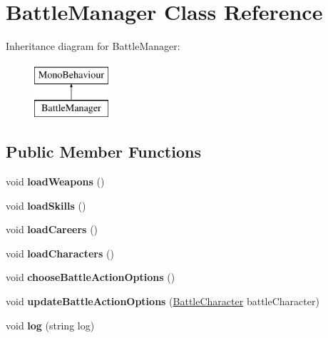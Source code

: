 \hypertarget{class_battle_manager}{}\section{Battle\+Manager Class Reference}
\label{class_battle_manager}
Inheritance diagram for Battle\+Manager\+:\begin{figure}[H]
\begin{center}
\leavevmode
\includegraphics[height=2.000000cm]{class_battle_manager}
\end{center}
\end{figure}
\subsection*{Public Member Functions}
\begin{DoxyCompactItemize}
\item 
void {\bfseries load\+Weapons} ()\hypertarget{class_battle_manager_a9e0d43290178a392008003dd11749f41}{}\label{class_battle_manager_a9e0d43290178a392008003dd11749f41}

\item 
void {\bfseries load\+Skills} ()\hypertarget{class_battle_manager_ac0f8f7e98a872d36a5306f4f6a9efd2d}{}\label{class_battle_manager_ac0f8f7e98a872d36a5306f4f6a9efd2d}

\item 
void {\bfseries load\+Careers} ()\hypertarget{class_battle_manager_ac81f723ff972fcc3560c1e8b4e21021c}{}\label{class_battle_manager_ac81f723ff972fcc3560c1e8b4e21021c}

\item 
void {\bfseries load\+Characters} ()\hypertarget{class_battle_manager_a9dbc581b42d93189af76255d0a97bfe8}{}\label{class_battle_manager_a9dbc581b42d93189af76255d0a97bfe8}

\item 
void {\bfseries choose\+Battle\+Action\+Options} ()\hypertarget{class_battle_manager_a5c1f4bd0e5bd3ed84bff11aec817a32f}{}\label{class_battle_manager_a5c1f4bd0e5bd3ed84bff11aec817a32f}

\item 
void {\bfseries update\+Battle\+Action\+Options} (\hyperlink{class_battle_character}{Battle\+Character} battle\+Character)\hypertarget{class_battle_manager_a1a69feabd37972f705051cd93ee492cd}{}\label{class_battle_manager_a1a69feabd37972f705051cd93ee492cd}

\item 
void {\bfseries log} (string log)\hypertarget{class_battle_manager_a7639eca7072e127ae92c5e0e41b74177}{}\label{class_battle_manager_a7639eca7072e127ae92c5e0e41b74177}

\end{DoxyCompactItemize}
